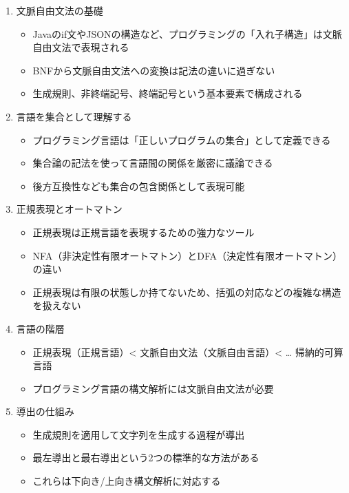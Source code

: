 \begin{enumerate}
\item
  文脈自由文法の基礎

  \begin{itemize}
  \item
    Javaのif文やJSONの構造など、プログラミングの「入れ子構造」は文脈自由文法で表現される
  \item
    BNFから文脈自由文法への変換は記法の違いに過ぎない
  \item
    生成規則、非終端記号、終端記号という基本要素で構成される
  \end{itemize}
\item
  言語を集合として理解する

  \begin{itemize}
  \item
    プログラミング言語は「正しいプログラムの集合」として定義できる
  \item
    集合論の記法を使って言語間の関係を厳密に議論できる
  \item
    後方互換性なども集合の包含関係として表現可能
  \end{itemize}
\item
  正規表現とオートマトン

  \begin{itemize}
  \item
    正規表現は正規言語を表現するための強力なツール
  \item
    NFA（非決定性有限オートマトン）とDFA（決定性有限オートマトン）の違い
  \item
    正規表現は有限の状態しか持てないため、括弧の対応などの複雑な構造を扱えない
  \end{itemize}
\item
  言語の階層

  \begin{itemize}
  \item
    正規表現（正規言語）\textless{}
    文脈自由文法（文脈自由言語）\textless{} \ldots{} 帰納的可算言語
  \item
    プログラミング言語の構文解析には文脈自由文法が必要
  \end{itemize}
\item
  導出の仕組み

  \begin{itemize}
  \item
    生成規則を適用して文字列を生成する過程が導出
  \item
    最左導出と最右導出という2つの標準的な方法がある
  \item
    これらは下向き/上向き構文解析に対応する
  \end{itemize}
\end{enumerate}

